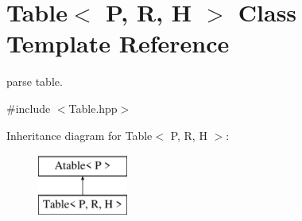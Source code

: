 \hypertarget{classTable}{}\section{Table$<$ P, R, H $>$ Class Template Reference}
\label{classTable}


parse table.  




{\ttfamily \#include $<$Table.\+hpp$>$}

Inheritance diagram for Table$<$ P, R, H $>$\+:\begin{figure}[H]
\begin{center}
\leavevmode
\includegraphics[height=2.000000cm]{classTable}
\end{center}
\end{figure}
